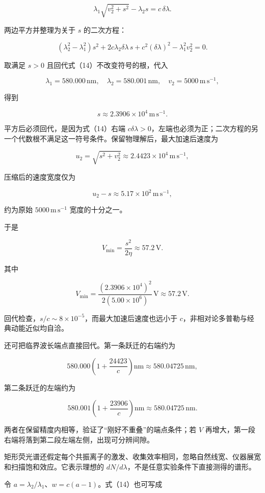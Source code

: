 \documentclass[12pt,a4paper,UTF8]{ctexart}
\begin{document}
\[
\lambda_1\sqrt{v_2^2+s^2}
-\lambda_2s
=c\,\delta\lambda.
\tag{14}
\]

两边平方并整理为关于 \(s\) 的二次方程：

\[
(\lambda_2^2-\lambda_1^2)s^2
+2c\lambda_2\delta\lambda\,s
+c^2(\delta\lambda)^2
-\lambda_1^2v_2^2=0.
\tag{15}
\]

取满足 \(s>0\) 且回代式（14）不改变符号的根，代入

\[
\lambda_1=580.000\,\mathrm{nm},\quad
\lambda_2=580.001\,\mathrm{nm},\quad
v_2=5000\,\mathrm{m\,s^{-1}},
\]

得到

\[
s\approx2.3906\times10^4\,\mathrm{m\,s^{-1}}.
\tag{16}
\]

平方后必须回代，是因为式（14）右端
\(c\delta\lambda>0\)，左端也必须为正；二次方程的另一个代数根不满足这一符号条件。保留物理解后，最大加速后速度为

\[
u_2=\sqrt{s^2+v_2^2}
\approx2.4423\times10^4\,\mathrm{m\,s^{-1}},
\]

压缩后的速度宽度仅为

\[
u_2-s\approx5.17\times10^2\,\mathrm{m\,s^{-1}},
\]

约为原始 \(5000\,\mathrm{m\,s^{-1}}\) 宽度的十分之一。

于是

\[
\boxed{
V_{\min}=\frac{s^2}{2\eta}
\approx57.2\,\mathrm V
}.
\tag{17}
\]

其中

\[
V_{\min}
=\frac{(2.3906\times10^4)^2}
{2(5.00\times10^6)}\,\mathrm V
\approx57.2\,\mathrm V.
\]

回代检查，\(s/c\sim8\times10^{-5}\)，而最大加速后速度也远小于
\(c\)，非相对论多普勒与经典动能近似均自洽。

还可把临界波长端点直接回代。第一条跃迁的右端约为

\[
580.000\left(1+\frac{24423}{c}\right)\mathrm{nm}
\approx580.04725\,\mathrm{nm},
\]

第二条跃迁的左端约为

\[
580.001\left(1+\frac{23906}{c}\right)\mathrm{nm}
\approx580.04725\,\mathrm{nm}.
\]

两者在保留精度内相等，验证了``刚好不重叠''的端点条件；若 \(V\)
再增大，第一段右端将落到第二段左端左侧，出现可分辨间隙。

矩形荧光谱还假定每个共振离子的激发、收集效率相同，忽略自然线宽、仪器展宽和扫描饱和效应。它表示理想的
\(dN/d\lambda\)，不是任意实验条件下直接测得的谱形。

令 \(a=\lambda_2/\lambda_1\)、\(w=c(a-1)\)。式（14）也可写成
\end{document}
